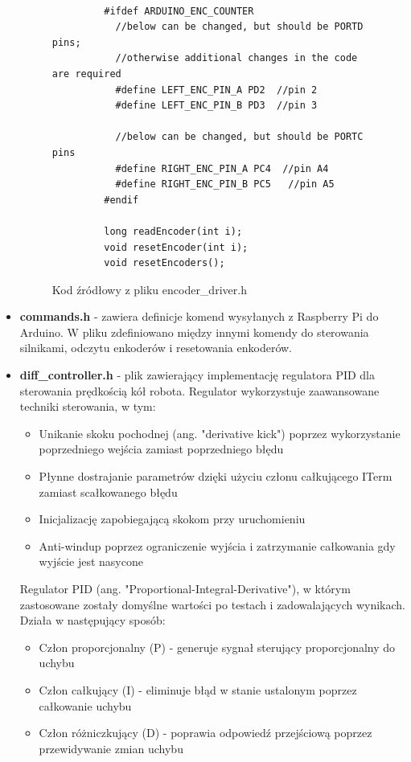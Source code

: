 \documentclass[a4paper,twoside,12pt]{book}
\begin{document}
\begin{itemize}
\begin{figure}[!hb]
\begin{lstlisting}
			
		 #ifdef ARDUINO_ENC_COUNTER
		   //below can be changed, but should be PORTD pins; 
		   //otherwise additional changes in the code are required
		   #define LEFT_ENC_PIN_A PD2  //pin 2
		   #define LEFT_ENC_PIN_B PD3  //pin 3
		   
		   //below can be changed, but should be PORTC pins
		   #define RIGHT_ENC_PIN_A PC4  //pin A4
		   #define RIGHT_ENC_PIN_B PC5   //pin A5
		 #endif
			
		 long readEncoder(int i);
		 void resetEncoder(int i);
		 void resetEncoders();
			\end{lstlisting}
			\caption{Kod źródłowy z pliku encoder\_driver.h}
			\label{fig:encoder-driver}
			\end{figure}
			
			\item \textbf{commands.h} - zawiera definicje komend wysyłanych z Raspberry Pi do Arduino. W pliku zdefiniowano między innymi komendy do sterowania silnikami, odczytu enkoderów i resetowania enkoderów.
			\item \textbf{diff\_controller.h} - plik zawierający implementację regulatora PID dla sterowania prędkością kół robota. Regulator wykorzystuje zaawansowane techniki sterowania, w tym:

			\begin{itemize}
				\item Unikanie skoku pochodnej (ang. "derivative kick") poprzez wykorzystanie poprzedniego wejścia zamiast poprzedniego błędu
				\item Płynne dostrajanie parametrów dzięki użyciu członu całkującego ITerm zamiast scałkowanego błędu
				\item Inicjalizację zapobiegającą skokom przy uruchomieniu
				\item Anti-windup poprzez ograniczenie wyjścia i zatrzymanie całkowania gdy wyjście jest nasycone
			\end{itemize}

			Regulator PID (ang. "Proportional-Integral-Derivative"), w którym zastosowane zostały domyślne wartości po testach i zadowalających wynikach.  Działa w następujący sposób:
			\begin{itemize}
				\item Człon proporcjonalny (P) - generuje sygnał sterujący proporcjonalny do uchybu
				\item Człon całkujący (I) - eliminuje błąd w stanie ustalonym poprzez całkowanie uchybu
				\item Człon różniczkujący (D) - poprawia odpowiedź przejściową poprzez przewidywanie zmian uchybu
			\end{itemize}


\end{itemize}
\end{document}
